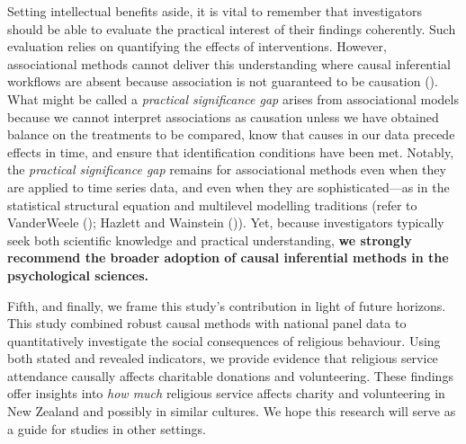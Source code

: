 \documentclass[
  single column]{article}
\begin{document}
Setting intellectual benefits aside, it is vital to remember that
investigators should be able to evaluate the practical interest of their
findings coherently. Such evaluation relies on quantifying the effects
of interventions. However, associational methods cannot deliver this
understanding where causal inferential workflows are absent because
association is not guaranteed to be causation
(). What might
be called a \emph{practical significance gap} arises from associational
models because we cannot interpret associations as causation unless we
have obtained balance on the treatments to be compared, know that causes
in our data precede effects in time, and ensure that identification
conditions have been met. Notably, the \emph{practical significance gap}
remains for associational methods even when they are applied to time
series data, and even when they are sophisticated---as in the
statistical structural equation and multilevel modelling traditions
(refer to VanderWeele ();
Hazlett and Wainstein ()).
Yet, because investigators typically seek both scientific knowledge and
practical understanding, \textbf{we strongly recommend the broader
adoption of causal inferential methods in the psychological sciences.}

Fifth, and finally, we frame this study's contribution in light of
future horizons. This study combined robust causal methods with national
panel data to quantitatively investigate the social consequences of
religious behaviour. Using both stated and revealed indicators, we
provide evidence that religious service attendance causally affects
charitable donations and volunteering. These findings offer insights
into \emph{how much} religious service affects charity and volunteering
in New Zealand and possibly in similar cultures. We hope this research
will serve as a guide for studies in other settings.
\end{document}
